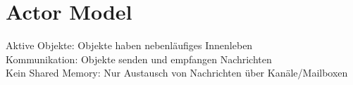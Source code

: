 
\section{Actor Model}
\textcolor{b}{Aktive Objekte:} Objekte haben nebenläufiges Innenleben\\
\textcolor{b}{Kommunikation:} Objekte senden und empfangen Nachrichten\\
\textcolor{b}{Kein Shared Memory:} Nur Austausch von Nachrichten über Kanäle/Mailboxen

